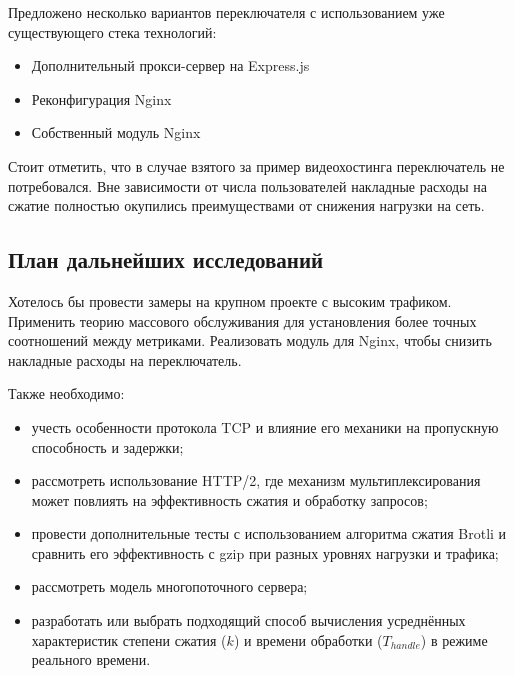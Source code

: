 \documentclass[12pt]{article}
\begin{document}
Предложено несколько вариантов переключателя с использованием уже существующего стека технологий:
\begin{itemize}
    \item Дополнительный прокси-сервер на Express.js
    \item Реконфигурация Nginx
    \item Собственный модуль Nginx
\end{itemize}

Стоит отметить, что в случае взятого за пример видеохостинга переключатель не потребовался. Вне зависимости от числа пользователей
накладные расходы на сжатие полностью окупились преимуществами от снижения нагрузки на сеть.

\subsection{План дальнейших исследований}

Хотелось бы провести замеры на крупном проекте с высоким трафиком. Применить теорию массового обслуживания для установления более точных
соотношений между метриками. Реализовать модуль для Nginx, чтобы снизить накладные расходы на переключатель.

Также необходимо:
\begin{itemize}
    \item учесть особенности протокола TCP и влияние его механики на пропускную способность и задержки;
    \item рассмотреть использование HTTP/2, где механизм мультиплексирования может повлиять на эффективность сжатия и обработку запросов;
    \item провести дополнительные тесты с использованием алгоритма сжатия Brotli и сравнить его эффективность с gzip при разных уровнях нагрузки и трафика;
    \item рассмотреть модель многопоточного сервера;
    \item разработать или выбрать подходящий способ вычисления усреднённых характеристик степени сжатия ($k$) и времени обработки ($T_{handle}$) в режиме реального времени.
\end{itemize}
\end{document}
